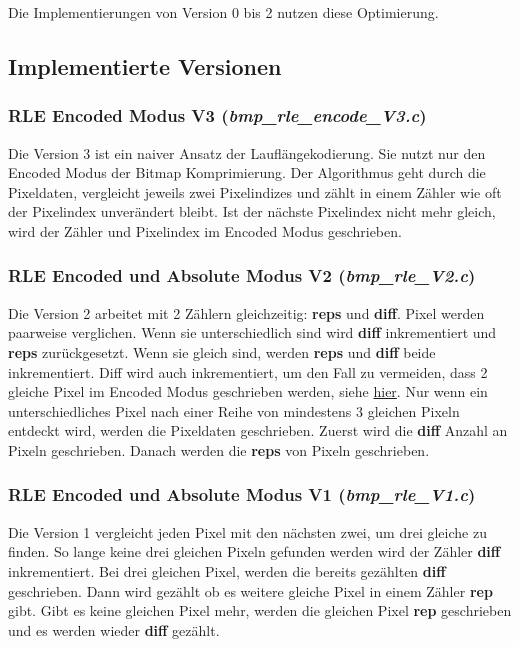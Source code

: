 \documentclass[course=erap]{aspdoc}
\begin{document}
Die Implementierungen von Version 0 bis 2 nutzen diese Optimierung.

\subsection{Implementierte Versionen}

\subsubsection{RLE Encoded Modus V3 (\textit{bmp\_rle\_encode\_V3.c})}
Die Version 3 ist ein naiver Ansatz der Lauflängekodierung. Sie nutzt nur den Encoded Modus der Bitmap Komprimierung. Der Algorithmus geht durch die Pixeldaten, vergleicht jeweils zwei Pixelindizes und zählt in einem Zähler wie oft der Pixelindex unverändert bleibt. Ist der nächste Pixelindex nicht mehr gleich, wird der Zähler und Pixelindex im Encoded Modus geschrieben.

\subsubsection{RLE Encoded und Absolute Modus V2 (\textit{bmp\_rle\_V2.c})}
Die Version 2 arbeitet mit 2 Zählern gleichzeitig: \textbf{reps} und \textbf{diff}. Pixel werden paarweise verglichen. Wenn sie unterschiedlich sind wird \textbf{diff} inkrementiert und \textbf{reps} zurückgesetzt. Wenn sie gleich sind, werden \textbf{reps} und \textbf{diff} beide inkrementiert. Diff wird auch inkrementiert, um den Fall zu vermeiden, dass 2 gleiche Pixel im Encoded Modus geschrieben werden, siehe \hyperref[sec:Optimierung]{hier}. Nur wenn ein unterschiedliches Pixel nach einer Reihe von mindestens 3 gleichen Pixeln entdeckt wird, werden die Pixeldaten geschrieben. Zuerst wird die \textbf{diff} Anzahl an Pixeln geschrieben. Danach werden die \textbf{reps} von Pixeln geschrieben.

\subsubsection{RLE Encoded und Absolute Modus V1 (\textit{bmp\_rle\_V1.c})}
Die Version 1 vergleicht jeden Pixel mit den nächsten zwei, um drei gleiche zu finden. So lange keine drei gleichen Pixeln gefunden werden wird der Zähler \textbf{diff} inkrementiert. Bei drei gleichen Pixel, werden die bereits gezählten \textbf{diff} geschrieben. Dann wird gezählt ob es weitere gleiche Pixel in einem Zähler \textbf{rep} gibt. Gibt es keine gleichen Pixel mehr, werden die gleichen Pixel \textbf{rep} geschrieben und es werden wieder \textbf{diff} gezählt. 
\end{document}
